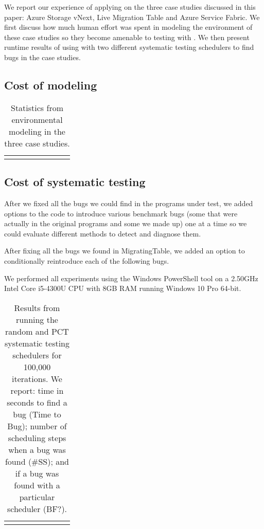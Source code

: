 We report our experience of applying \psharp on the three case studies discussed in this paper: Azure Storage vNext, Live Migration Table and Azure Service Fabric. We first discuss how much human effort was spent in modeling the environment of these case studies so they become amenable to testing with \psharp. We then present runtime results of using \psharp with two different systematic testing schedulers to find bugs in the case studies.

\subsection{Cost of modeling}

\newcommand{\colspacing}{\hspace{1.8em}}
\begin{table}[t]
\small
\centering
\setlength{\tabcolsep}{0.3em}
\label{tab:stats}
\begin{tabular}{l rrrrr rr}
\centering

\end{tabular}
\caption{Statistics from environmental modeling in the three case studies.}
\end{table}

\subsection{Cost of systematic testing}

After we fixed all the bugs we could find in the programs under test, we added options to the code to introduce various benchmark bugs (some that were actually in the original programs and some we made up) one at a time so we could evaluate different methods to detect and diagnose them.

After fixing all the bugs we found in MigratingTable, we added an option to conditionally reintroduce each of the following bugs.

We performed all experiments using the Windows PowerShell tool on a 2.50GHz Intel Core i5-4300U CPU with 8GB RAM running Windows 10 Pro 64-bit.

\setlength{\tabcolsep}{.72em}
\begin{table*}[t]
\small
\centering
\begin{tabular}{rl rrr rrr}
\centering

\end{tabular}
\caption{Results from running the \psharp random and PCT systematic testing schedulers for 100,000 iterations. We report: time in seconds to find a bug (Time to Bug); number of scheduling steps when a bug was found (\#SS); and if a bug was found with a particular scheduler (BF?).}
\label{tab:testing}
\end{table*}

